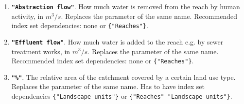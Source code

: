 \documentclass[11pt]{article}
\theoremstyle{definition}
\begin{document}
\begin{enumerate}[i]
\item {\bf\tt "Abstraction flow"}. How much water is removed from the reach by human activity, in $m^3/s$. Replaces the parameter of the same name. Recommended index set dependencies: none or {\tt \{"Reaches"\}}.
\item {\bf\tt "Effluent flow"}. How much water is added to the reach e.g. by sewer treatment works, in $m^3/s$. Replaces the parameter of the same name. Recommended index set dependencies: none or {\tt \{"Reaches"\}}.
\item {\bf\tt "\%"}. The relative area of the catchment covered by a certain land use type. Replaces the parameter of the same name. Has to have index set dependencies {\tt \{"Landscape units"\}} or {\tt \{"Reaches" "Landscape units"\}}.
\end{enumerate}



\end{document}
